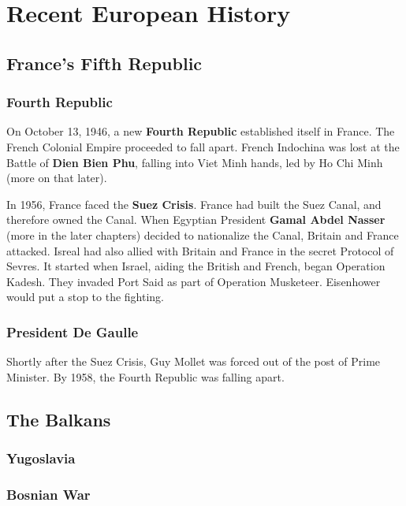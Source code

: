 \chapter{Recent European History}

\section{France's Fifth Republic}

\subsection*{Fourth Republic}

On October 13, 1946, a new \textbf{Fourth Republic} established itself in France.
The French Colonial Empire proceeded to fall apart.
French Indochina was lost at the Battle of \textbf{Dien Bien Phu},
falling into Viet Minh hands, led by Ho Chi Minh (more on that later).

In 1956, France faced the \textbf{Suez Crisis}.
France had built the Suez Canal, and therefore owned the Canal.
When Egyptian President \textbf{Gamal Abdel Nasser} (more in the later chapters)
decided to nationalize the Canal, Britain and France attacked.
Isreal had also allied with Britain and France in the secret Protocol of Sevres.
It started when Israel, aiding the British and French, began Operation Kadesh.
They invaded Port Said as part of Operation Musketeer.
Eisenhower would put a stop to the fighting.

\subsection*{President De Gaulle}

Shortly after the Suez Crisis, Guy Mollet was forced out of the post of Prime Minister.
By 1958, the Fourth Republic was falling apart.

\section{The Balkans}

\subsection*{Yugoslavia}

\subsection*{Bosnian War}

